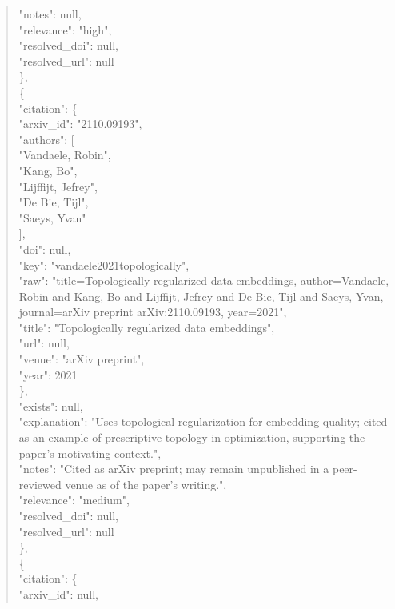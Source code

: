 \documentclass[11pt]{article}
\begin{document}
\begin{quote}
      "notes": null,\\
      "relevance": "high",\\
      "resolved\_doi": null,\\
      "resolved\_url": null\\
    \},\\
    \{\\
      "citation": \{\\
        "arxiv\_id": "2110.09193",\\
        "authors": [\\
          "Vandaele, Robin",\\
          "Kang, Bo",\\
          "Lijffijt, Jefrey",\\
          "De Bie, Tijl",\\
          "Saeys, Yvan"\\
        ],\\
        "doi": null,\\
        "key": "vandaele2021topologically",\\
        "raw": "title=Topologically regularized data embeddings, author=Vandaele, Robin and Kang, Bo and Lijffijt, Jefrey and De Bie, Tijl and Saeys, Yvan, journal=arXiv preprint arXiv:2110.09193, year=2021",\\
        "title": "Topologically regularized data embeddings",\\
        "url": null,\\
        "venue": "arXiv preprint",\\
        "year": 2021\\
      \},\\
      "exists": null,\\
      "explanation": "Uses topological regularization for embedding quality; cited as an example of prescriptive topology in optimization, supporting the paper's motivating context.",\\
      "notes": "Cited as arXiv preprint; may remain unpublished in a peer-reviewed venue as of the paper's writing.",\\
      "relevance": "medium",\\
      "resolved\_doi": null,\\
      "resolved\_url": null\\
    \},\\
    \{\\
      "citation": \{\\
        "arxiv\_id": null,\\

\end{quote}
\end{document}
